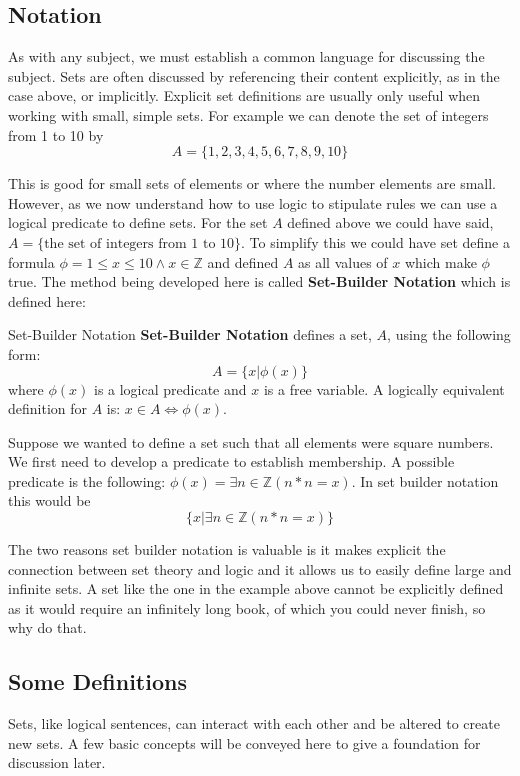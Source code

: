 \subsection{Notation}
As with any subject, we must establish a common language for discussing the subject.
Sets are often discussed by referencing their content explicitly, as in the case above, or implicitly.
Explicit set definitions are usually only useful when working with small, simple sets.
For example we can denote the set of integers from 1 to 10 by 
$$
A = \{1,2,3,4,5,6,7,8,9,10\}
$$

This is good for small sets of elements or where the number elements are small.
However, as we now understand how to use logic to stipulate rules we can use a logical predicate to define sets.
For the set $A$ defined above we could have said, $A = \{\text{the set of integers from 1 to 10}\}$.
To simplify this we could have set define a formula $\phi = 1 \le x \le 10 \land x \in \mathbb{Z}$ and defined $A$ as all values of $x$ which make $\phi$ true.
The method being developed here is called \textbf{Set-Builder Notation} which is defined here:
\begin{defn}{Set-Builder Notation}
  \textbf{Set-Builder Notation} defines a set, $A$, using the following form:
  $$
  A = \{x|\phi(x)\}
  $$
  where $\phi(x)$ is a logical predicate and $x$ is a free variable.
  A logically equivalent definition for $A$ is: $x \in A \iff \phi(x)$.
\end{defn}

\begin{ex}
  Suppose we wanted to define a set such that all elements were square numbers.
  We first need to develop a predicate to establish membership.
  A possible predicate is the following: $\phi(x) = \exists n \in \mathbb{Z} (n*n = x)$.
  In set builder notation this would be
  $$
    \{ x | \exists n \in \mathbb{Z} (n*n = x) \}
  $$
\end{ex}

The two reasons set builder notation is valuable is it makes explicit the connection between set theory and logic and it allows us to easily define large and infinite sets.
A set like the one in the example above cannot be explicitly defined as it would require an infinitely long book, of which you could never finish, so why do that.


\subsection{Some Definitions}
Sets, like logical sentences, can interact with each other and be altered to create new sets.
A few basic concepts will be conveyed here to give a foundation for discussion later.


